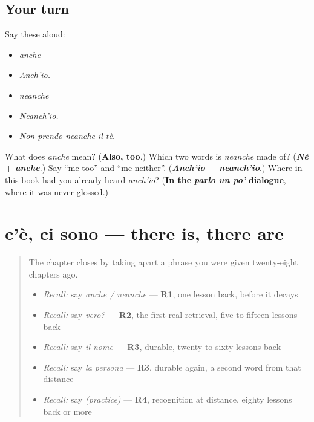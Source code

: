 \subsection*{Your turn}
Say these aloud:

\begin{itemize}
\raggedright
  \item \emph{anche}
  \item \emph{Anch'io.}
  \item \emph{neanche}
  \item \emph{Neanch'io.}
  \item \emph{Non prendo neanche il tè.}
\end{itemize}

\begin{tcolorbox}[breakable,colback=teal!4,colframe=teal!35!black,title={Before you move on}]
What does \emph{anche} mean? (\textbf{Also, too}.) Which two words is \emph{neanche} made of? (\emph{\textbf{Né}} \textbf{+} \emph{\textbf{anche}}.) Say \textquotedblleft{}me too\textquotedblright{} and \textquotedblleft{}me neither\textquotedblright{}. (\emph{\textbf{Anch'io}} — \emph{\textbf{neanch'io}}.) Where in this book had you already heard \emph{anch'io}? (\textbf{In the} \emph{\textbf{parlo un po'}} \textbf{dialogue}, where it was never glossed.)
\end{tcolorbox}
\section[c'è / ci sono]{c'è, ci sono — there is, there are}

\label{lesson:IT-C30-ce}



\begin{quote}
The chapter closes by taking apart a phrase you were given twenty-eight chapters ago.

\begin{itemize}
\raggedright
  \item \emph{Recall:} say \emph{anche / neanche} — \textbf{R1}, one lesson back, before it decays
  \item \emph{Recall:} say \emph{vero?} — \textbf{R2}, the first real retrieval, five to fifteen lessons back
  \item \emph{Recall:} say \emph{il nome} — \textbf{R3}, durable, twenty to sixty lessons back
  \item \emph{Recall:} say \emph{la persona} — \textbf{R3}, durable again, a second word from that distance
  \item \emph{Recall:} say \emph{(practice)} — \textbf{R4}, recognition at distance, eighty lessons back or more
\end{itemize}
\end{quote}

